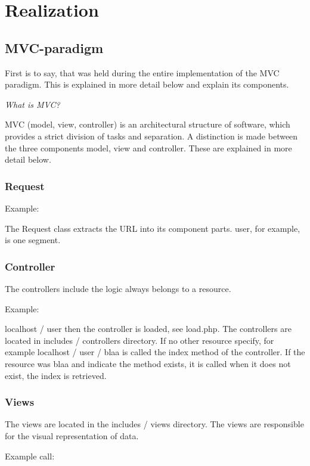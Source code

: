 \documentclass[a4paper,12pt,oneside]{article} %
\begin{document}
\section{Realization}


\subsection{MVC-paradigm}

First is to say, that was held during the entire implementation of
the MVC paradigm. This is explained in more detail below and explain
its components. 

\emph{What is MVC? }

MVC (model, view, controller) is an architectural structure of software,
which provides a strict division of tasks and separation. A distinction
is made between the three components model, view and controller. These
are explained in more detail below.


\subsubsection*{Request}

Example: 

 The Request class extracts the URL into its component parts. user,
for example, is one segment.


\subsubsection*{Controller}

The controllers include the logic always belongs to a resource. 

Example: 


localhost / user
then the controller is loaded, see load.php. The controllers are
located in includes / controllers directory. If no other resource
specify, for example 
localhost / user / blaa
 is called the index method of the controller. If the resource was
blaa and indicate the method exists, it is called when it does not
exist, the index is retrieved.


\subsubsection*{Views}

The views are located in the 
includes / views
 directory. The views are responsible for the visual representation
of data.

Example call:
\end{document}
